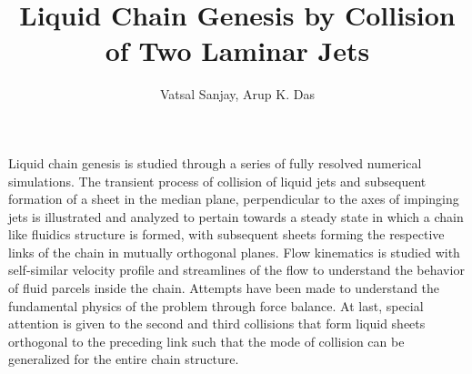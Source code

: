 \documentclass{jfm}
\title{Liquid Chain Genesis by Collision of Two Laminar Jets}
\author{Vatsal Sanjay,
  Arup K. Das\corresp{\email{arupdas80@gmail.com}}}
\affiliation{Department of Mechanical and Industrial Engineering, Indian Institute of Technology, Roorkee}
\begin{document}
\newcommand{\MarkerCircleRed}{\raisebox{0.5pt}{\tikz{\node[draw,scale=0.4,circle,fill=red!100!red](){};}}}
\newcommand{\MarkerSquareRed}{\raisebox{0.5pt}{\tikz{\node[draw,scale=0.4,regular polygon, regular polygon sides=4,fill=black!20!red](){};}}}
\newcommand{\MarkerDiamondBlack}{\raisebox{0pt}{\tikz{\node[draw,scale=0.4,diamond,fill=black!100!](){};}}}
\newcommand{\MarkerSquareEmpty}{\raisebox{0pt}{\tikz{\node[draw,scale=0.4,regular polygon, regular polygon sides=4](){};}}}
\newcommand{\MarkerCircleEmpty}{\raisebox{0pt}{\tikz{\node[draw,scale=0.4,circle](){};}}}
\maketitle
\begin{abstract}
\end{abstract}
Liquid chain genesis is studied through a series of fully resolved numerical simulations. The transient process of collision of liquid jets and subsequent formation of a sheet in the median plane, perpendicular to the axes of impinging jets is illustrated and analyzed to pertain towards a steady state in which a chain like fluidics structure is formed, with subsequent sheets forming the respective links of the chain in mutually orthogonal planes. Flow kinematics is studied with self-similar velocity profile and streamlines of the flow to understand the behavior of fluid parcels inside the chain. Attempts have been made to understand the fundamental physics of the problem through force balance. At last, special attention is given to the second and third collisions that form liquid sheets orthogonal to the preceding link such that the mode of collision can be generalized for the entire chain structure.
\begin{keywords}
\end{keywords}
\end{document}
